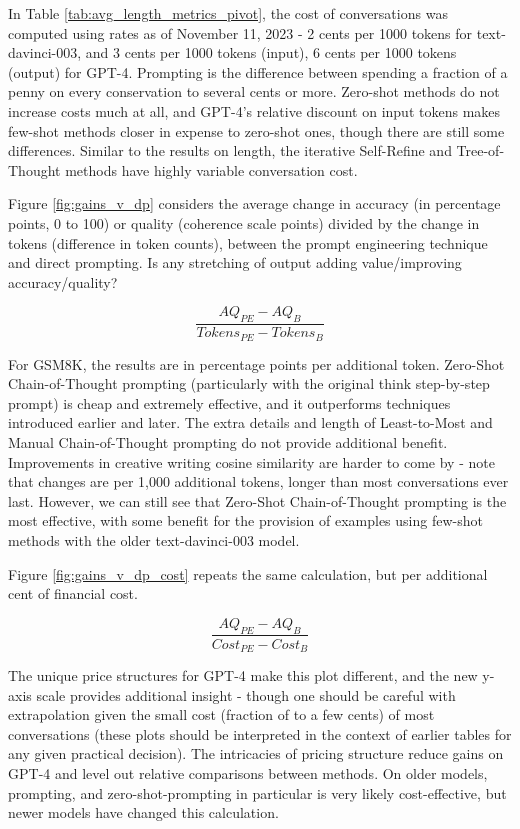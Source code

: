 \documentclass[11pt]{article}
\begin{document}
In Table \ref{tab:avg_length_metrics_pivot}, the cost of conversations was computed using rates as of November 11, 2023 - 2 cents per 1000 tokens for text-davinci-003, and 3 cents per 1000 tokens (input), 6 cents per 1000 tokens (output) for GPT-4. Prompting is the difference between spending a fraction of a penny on every conservation to several cents or more. Zero-shot methods do not increase costs much at all, and GPT-4's relative discount on input tokens makes few-shot methods closer in expense to zero-shot ones, though there are still some differences. Similar to the results on length, the iterative Self-Refine and Tree-of-Thought methods have highly variable conversation cost.

Figure \ref{fig:gains_v_dp} considers the average change in accuracy (in percentage points, 0 to 100) or quality (coherence scale points) divided by the change in tokens (difference in token counts), between the prompt engineering technique and direct prompting. Is any stretching of output adding value/improving accuracy/quality?

\begin{displaymath}
  \frac{AQ_{PE} - AQ_{B}}{Tokens_{PE} - Tokens_{B}}
\end{displaymath}

For GSM8K, the results are in percentage points per additional token. Zero-Shot Chain-of-Thought prompting (particularly with the original think step-by-step prompt) is cheap and extremely effective, and it outperforms techniques introduced earlier and later. The extra details and length of Least-to-Most and Manual Chain-of-Thought prompting do not provide additional benefit. Improvements in creative writing cosine similarity are harder to come by - note that changes are per 1,000 additional tokens, longer than most conversations ever last. However, we can still see that Zero-Shot Chain-of-Thought prompting is the most effective, with some benefit for the provision of examples using few-shot methods with the older text-davinci-003 model.

Figure \ref{fig:gains_v_dp_cost} repeats the same calculation, but per additional cent of financial cost.

\begin{displaymath}
  \frac{AQ_{PE} - AQ_{B}}{Cost_{PE} - Cost_{B}}
\end{displaymath}

The unique price structures for GPT-4 make this plot different, and the new y-axis scale provides additional insight - though one should be careful with extrapolation given the small cost (fraction of to a few cents) of most conversations (these plots should be interpreted in the context of earlier tables for any given practical decision). The intricacies of pricing structure reduce gains on GPT-4 and level out relative comparisons between methods. On older models, prompting, and zero-shot-prompting in particular is very likely cost-effective, but newer models have changed this calculation.
\end{document}

